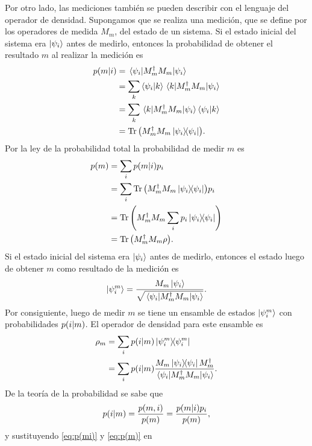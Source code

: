 Por otro lado, las mediciones también se pueden describir con el 
lenguaje del operador de densidad. Supongamos que se realiza una medición, 
que se define por los operadores de medida $M_m$, del estado de un sistema. 
Si el estado inicial del sistema era $\ket{\psi_i}$ antes de medirlo, 
entonces la probabilidad de obtener el resultado $m$ al realizar
la medición es
\begin{align}
	p\qty(m|i) &= \matrixel{\psii}{M_m^{\dagger}M_m}{\psii}\\
	&= \sum _k \braket{\psii}{k}\matrixel{k}{M_m^{\dagger}M_m}{\psii}\\
	&=\sum _k \matrixel{k}{M_m^{\dagger}M_m}{\psii}\braket{\psii}{k}\\
	&=\Tr \qty(M_m^{\dagger}M_m\dyad{\psii}{\psii}). \label{eq:p(mi)}
\end{align}
Por la ley de la probabilidad total la probabilidad de medir $m$ es
\begin{align}
	p(m) &= \sum_i p(m\vert i)p_i \\
			 &= \sum_i \Tr \qty(M_m^{\dagger}M_m\dyad{\psii}{\psii})p_i \\
			 &= \Tr \qty(M_m^{\dagger}M_m\sum_ip_i\dyad{\psii}{\psii}) \\
			 &= \Tr \qty(M_m^{\dagger}M_m\rho). \label{eq:p(m)}
\end{align}
Si el estado inicial del sistema era $\ket{\psi_{i} }$ antes de medirlo, 
entonces el estado luego de obtener $m$ como resultado de la medición es
\begin{align}
	\ket{\psi_i^m} = \frac{M_m\Pk{i}}{\sqrt{\matrixel{\psii}{M_m^{\dagger}
	M_m}{\psii}}}.
\end{align}
Por consiguiente, luego de medir $m$ se tiene un ensamble de estados
$\ket{\psi_i^m}$ con probabilidades $p\qty(i\vert m)$. El operador
de densidad para este ensamble es
\begin{align}
	\rho_m &= \sum _i p\qty(i\vert m)\dyad{\psii^m}{\psii^m}
	\nonumber \\
				 &= \sum _i p\qty(i\vert m)
				 \frac{M_m\dyad{\psii}{\psii}M_m^{\dagger}}
				 {\matrixel{\psii}{M_m^{\dagger}M_m}{\psii}}. 
				 \label{eq:rho-after-measurement}
\end{align}
De la teoría de la probabilidad se sabe que
\begin{align}
	p\qty(i\vert m) = \frac{p(m,i)}{p(m)}=
	\frac{p\qty(m\vert i)p_i}{p(m)},
\end{align}
y sustituyendo \eqref{eq:p(mi)} y \eqref{eq:p(m)} en 

